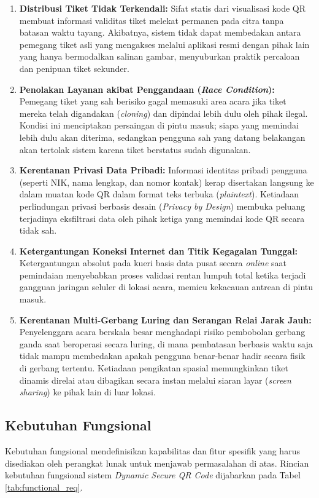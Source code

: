 \begin{enumerate}
    \item \textbf{Distribusi Tiket Tidak Terkendali:} Sifat statis dari visualisasi kode QR membuat informasi validitas tiket melekat permanen pada citra tanpa batasan waktu tayang. Akibatnya, sistem tidak dapat membedakan antara pemegang tiket asli yang mengakses melalui aplikasi resmi dengan pihak lain yang hanya bermodalkan salinan gambar, menyuburkan praktik percaloan dan penipuan tiket sekunder.
    
    \item \textbf{Penolakan Layanan akibat Penggandaan (\textit{Race Condition}):} Pemegang tiket yang sah berisiko gagal memasuki area acara jika tiket mereka telah digandakan (\textit{cloning}) dan dipindai lebih dulu oleh pihak ilegal. Kondisi ini menciptakan persaingan di pintu masuk; siapa yang memindai lebih dulu akan diterima, sedangkan pengguna sah yang datang belakangan akan tertolak sistem karena tiket berstatus sudah digunakan.
    
    \item \textbf{Kerentanan Privasi Data Pribadi:} Informasi identitas pribadi pengguna (seperti NIK, nama lengkap, dan nomor kontak) kerap disertakan langsung ke dalam muatan kode QR dalam format teks terbuka (\textit{plaintext}). Ketiadaan perlindungan privasi berbasis desain (\textit{Privacy by Design}) membuka peluang terjadinya eksfiltrasi data oleh pihak ketiga yang memindai kode QR secara tidak sah.
    
    \item \textbf{Ketergantungan Koneksi Internet dan Titik Kegagalan Tunggal:} Ketergantungan absolut pada kueri basis data pusat secara \textit{online} saat pemindaian menyebabkan proses validasi rentan lumpuh total ketika terjadi gangguan jaringan seluler di lokasi acara, memicu kekacauan antrean di pintu masuk.

    \item \textbf{Kerentanan Multi-Gerbang Luring dan Serangan Relai Jarak Jauh:} Penyelenggara acara berskala besar menghadapi risiko pembobolan gerbang ganda saat beroperasi secara luring, di mana pembatasan berbasis waktu saja tidak mampu membedakan apakah pengguna benar-benar hadir secara fisik di gerbang tertentu. Ketiadaan pengikatan spasial memungkinkan tiket dinamis direlai atau dibagikan secara instan melalui siaran layar (\textit{screen sharing}) ke pihak lain di luar lokasi.
\end{enumerate}

\subsection{Kebutuhan Fungsional}
\label{subsec:kebutuhan_fungsional}
Kebutuhan fungsional mendefinisikan kapabilitas dan fitur spesifik yang harus disediakan oleh perangkat lunak untuk menjawab permasalahan di atas. Rincian kebutuhan fungsional sistem \textit{Dynamic Secure QR Code} dijabarkan pada Tabel \ref{tab:functional_req}.

